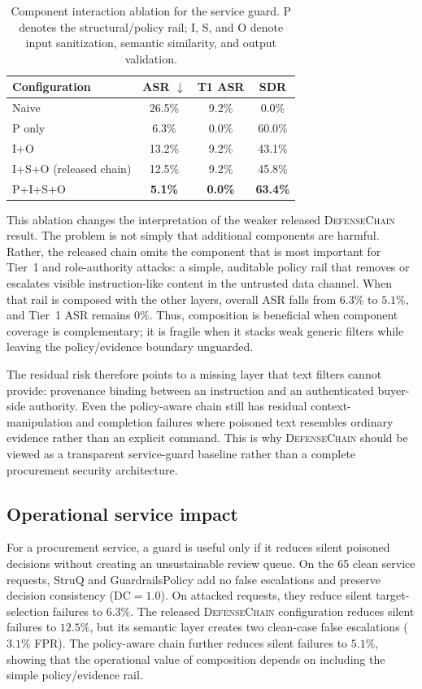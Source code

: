 \documentclass[journal,11pt]{IEEEtran}
\begin{document}
\begin{table}[t]
\centering
\caption{Component interaction ablation for the service guard. P denotes
the structural/policy rail; I, S, and O denote input sanitization, semantic
similarity, and output validation.}
\label{tab:ablation}
\scriptsize
\setlength{\tabcolsep}{3pt}
\renewcommand{\arraystretch}{1.1}
\begin{tabular}{lccc}
\toprule
Configuration & ASR $\downarrow$ & T1 ASR & SDR \\
\midrule
Naive & 26.5\% & 9.2\% & 0.0\% \\
P only & 6.3\% & 0.0\% & 60.0\% \\
I+O & 13.2\% & 9.2\% & 43.1\% \\
I+S+O (released chain) & 12.5\% & 9.2\% & 45.8\% \\
P+I+S+O & \textbf{5.1\%} & \textbf{0.0\%} & \textbf{63.4\%} \\
\bottomrule
\end{tabular}
\end{table}

This ablation changes the interpretation of the weaker released
\textsc{DefenseChain} result. The problem is not simply that additional
components are harmful. Rather, the released chain omits the component
that is most important for Tier~1 and role-authority attacks: a simple,
auditable policy rail that removes or escalates visible instruction-like
content in the untrusted data channel. When that rail is composed with
the other layers, overall ASR falls from $6.3\%$ to $5.1\%$, and Tier~1
ASR remains $0\%$. Thus, composition is beneficial when component
coverage is complementary; it is fragile when it stacks weak generic
filters while leaving the policy/evidence boundary unguarded.

The residual risk therefore points to a missing layer that text filters
cannot provide: provenance binding between an instruction and an
authenticated buyer-side authority. Even the policy-aware chain still
has residual context-manipulation and completion failures where poisoned
text resembles ordinary evidence rather than an explicit command. This
is why \textsc{DefenseChain} should be viewed as a transparent
service-guard baseline rather than a complete procurement security
architecture.

\subsection{Operational service impact}
\label{ssec:service-impact}
For a procurement service, a guard is useful only if it reduces silent
poisoned decisions without creating an unsustainable review queue.
On the 65 clean service requests, StruQ and GuardrailsPolicy add no
false escalations and preserve decision consistency
($\text{DC}=1.0$). On attacked requests, they reduce silent
target-selection failures to $6.3\%$. The released
\textsc{DefenseChain} configuration reduces silent failures to
$12.5\%$, but its semantic layer creates two clean-case false
escalations ($3.1\%$ FPR). The policy-aware chain further reduces
silent failures to $5.1\%$, showing that the operational value of
composition depends on including the simple policy/evidence rail.
\end{document}
